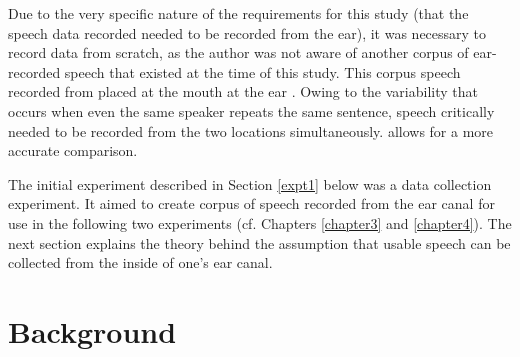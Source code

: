 Due to the very specific nature of the requirements for this study (that the speech data recorded needed to be recorded from the ear), it was necessary to record data from scratch, as the author was not aware of another corpus of ear-recorded speech that existed at the time of this study.  This corpus \DIFdelbegin {}\DIFdelend \DIFaddbegin {}\DIFaddend speech recorded from \DIFdelbegin {}\DIFdelend \DIFaddbegin {}\DIFaddend placed at the mouth \DIFdelbegin {}\DIFdelend \DIFaddbegin {}\DIFaddend at the ear \DIFdelbegin {}\DIFdelend \DIFaddbegin {}\DIFaddend . Owing to the variability that occurs when even the same speaker repeats the same sentence, speech critically needed to be recorded from the two locations simultaneously.  \DIFdelbegin {}\DIFdelend \DIFaddbegin {}\DIFaddend allows for a more accurate comparison\DIFdelbegin {}\DIFdelend \DIFaddbegin {}\DIFaddend .


The initial experiment described in Section \ref{expt1} below was a data collection experiment.  It aimed to create \DIFdelbegin {}\DIFdelend \DIFaddbegin {}\DIFaddend corpus of speech recorded from the ear canal \DIFaddbegin {}\DIFaddend for use in the following two experiments (cf. Chapters \ref{chapter3} and \ref{chapter4}).  The next section explains the theory behind the assumption that usable speech can be collected from the inside of one's ear canal.

\section{Background}



